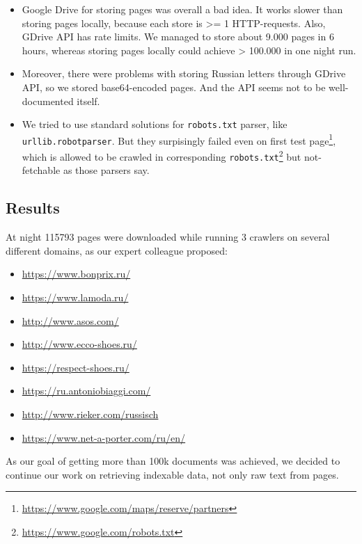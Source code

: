 \documentclass[format=sigconf]{acmart}
\newcommand{\todo}[1]{\textcolor{red}{\textbf{TODO:} #1}}
\begin{document}
\begin{itemize}
\item Google Drive for storing pages was overall a bad idea. It works slower than storing pages locally, because each store is >= 1 HTTP-requests. 
Also, GDrive API has rate limits. We managed to store about 9.000 pages in 6 hours, whereas storing pages locally could achieve > 100.000 in one night run.

\item Moreover, there were problems with storing Russian letters through GDrive API, so we stored base64-encoded pages. And the API seems not to be well-documented itself.

\item We tried to use standard solutions for \texttt{robots.txt} parser, like \texttt{urllib.robotparser}. 
But they surpisingly failed even on first test page\footnote{\url{https://www.google.com/maps/reserve/partners}}, which is allowed to be crawled in corresponding \texttt{robots.txt}\footnote{\url{https://www.google.com/robots.txt}} but not-fetchable as those parsers say. 
\end{itemize}


\subsection{Results}

At night 115793 pages were downloaded while running 3 crawlers on several different domains, as our expert colleague proposed:
\begin{itemize}
    \item \url{https://www.bonprix.ru/}
    \item \url{https://www.lamoda.ru/}
    \item \url{http://www.asos.com/}
    \item \url{http://www.ecco-shoes.ru/}
    \item \url{https://respect-shoes.ru/} %
    \item \url{https://ru.antoniobiaggi.com/} %
    \item \url{http://www.rieker.com/russisch}
    \item \url{https://www.net-a-porter.com/ru/en/}
\end{itemize}

As our goal of getting more than 100k documents was achieved, we decided to continue our work on retrieving indexable data, not only raw text from pages.
\end{document}
